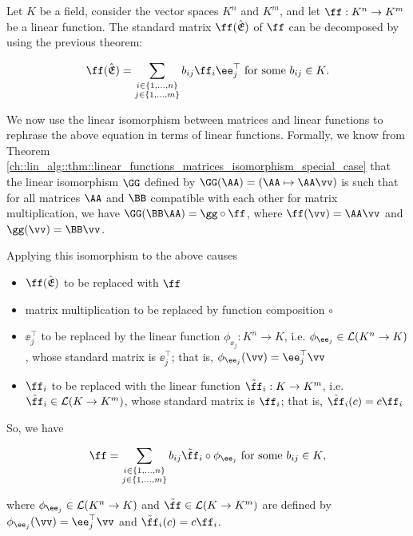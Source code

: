 \begin{deriv}

    Let $K$ be a field,  consider the vector spaces $K^n$ and $K^m$, and let $\ff:K^n \rightarrow K^m$ be a linear function. The standard matrix $\ff(\sE)$ of $\ff$ can be decomposed by using the previous theorem:

    \begin{align*}
        \ff(\sE) = \sum_{\substack{i \in \{1, ..., n\} \\ j \in \{1, ..., m\}}} b_{ij} \ff_i \ee_j^\top \text{ for some $b_{ij} \in K$}.
    \end{align*}

    We now use the linear isomorphism between matrices and linear functions to rephrase the above equation in terms of linear functions. Formally, we know from Theorem \ref{ch::lin_alg::thm::linear_functions_matrices_isomorphism_special_case} that the linear isomorphism $\GG$ defined by $\GG(\AA) = (\AA \mapsto \AA \vv)$ is such that for all matrices $\AA$ and $\BB$ compatible with each other for matrix multiplication, we have $\GG(\BB \AA) = \gg \circ \ff$, where $\ff(\vv) = \AA \vv$ and $\gg(\vv) = \BB \vv$.

    Applying this isomorphism to the above causes
    \begin{itemize}
        \item $\ff(\sE)$ to be replaced with $\ff$
        \item matrix multiplication to be replaced by function composition $\circ$
        \item $\ee_j^\top$ to be replaced by the linear function $\phi_{\ee_j}:K^n \rightarrow K$, i.e. $\phi_{\ee_j} \in \LLLL(K^n \rightarrow K)$, whose standard matrix is $\ee_j^\top$; that is, $\phi_{\ee_j}(\vv) = \ee_j^\top \vv$
        \item $\ff_i$ to be replaced with the linear function $\tilde{\ff}_i:K \rightarrow K^m$, i.e. $\tilde{\ff}_i \in \LLLL(K \rightarrow K^m)$, whose standard matrix is $\ff_i$; that is, $\tilde{\ff}_i(c) = c\ff_i$
    \end{itemize}

    So, we have

    \begin{align*}
        \ff = \sum_{\substack{i \in \{1, ..., n\} \\ j \in \{1, ..., m\}}} b_{ij} \tilde{\ff}_i \circ \phi_{\ee_j} \text{ for some $b_{ij} \in K$},
    \end{align*}

    where $\phi_{\ee_j} \in \LLLL(K^n \rightarrow K)$ and $\tilde{\ff} \in \LLLL(K \rightarrow K^m)$ are defined by $\phi_{\ee_j}(\vv) = \ee_j^\top \vv$ and $\tilde{\ff}_i(c) = c\ff_i$.
\end{deriv}

